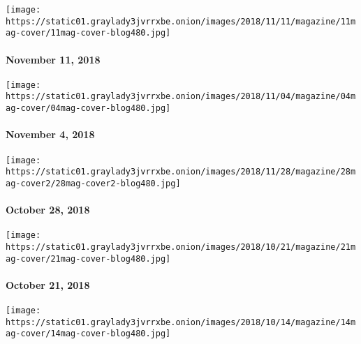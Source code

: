 \href{https://www.nytimes3xbfgragh.onion/issue/magazine/2018/11/16/The-111118-issue}{}

\texttt{[image: https://static01.graylady3jvrrxbe.onion/images/2018/11/11/magazine/11mag-cover/11mag-cover-blog480.jpg]}

\hypertarget{november-11-2018}{%
\paragraph{November 11, 2018}\label{november-11-2018}}

\href{https://www.nytimes3xbfgragh.onion/issue/magazine/2018/11/02/the-11042018-issue}{}

\texttt{[image: https://static01.graylady3jvrrxbe.onion/images/2018/11/04/magazine/04mag-cover/04mag-cover-blog480.jpg]}

\hypertarget{november-4-2018}{%
\paragraph{November 4, 2018}\label{november-4-2018}}

\href{https://www.nytimes3xbfgragh.onion/issue/magazine/2018/10/26/the-102818-issue}{}

\texttt{[image: https://static01.graylady3jvrrxbe.onion/images/2018/11/28/magazine/28mag-cover2/28mag-cover2-blog480.jpg]}

\hypertarget{october-28-2018}{%
\paragraph{October 28, 2018}\label{october-28-2018}}

\href{https://www.nytimes3xbfgragh.onion/issue/magazine/2018/10/19/the-102118-issue}{}

\texttt{[image: https://static01.graylady3jvrrxbe.onion/images/2018/10/21/magazine/21mag-cover/21mag-cover-blog480.jpg]}

\hypertarget{october-21-2018}{%
\paragraph{October 21, 2018}\label{october-21-2018}}

\href{https://www.nytimes3xbfgragh.onion/issue/magazine/2018/10/12/the-101418-issue}{}

\texttt{[image: https://static01.graylady3jvrrxbe.onion/images/2018/10/14/magazine/14mag-cover/14mag-cover-blog480.jpg]}

